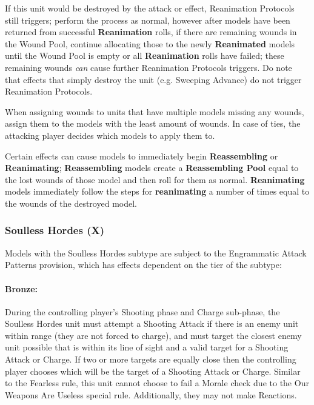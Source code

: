 \begin{multicols}{2}
If this unit would be destroyed by the attack or effect, Reanimation Protocols still triggers; perform the process as normal, however after models have been returned from successful \textbf{Reanimation} rolls, if there are remaining wounds in the Wound Pool, continue allocating those to the newly \textbf{Reanimated} models until the Wound Pool is empty or all \textbf{Reanimation} rolls have failed; these remaining wounds \textit{can} cause further Reanimation Protocols triggers. Do note that effects that simply destroy the unit (e.g. Sweeping Advance) do not trigger Reanimation Protocols.

When assigning wounds to units that have multiple models missing any wounds, assign them to the models with the least amount of wounds. In case of ties, the attacking player decides which models to apply them to.

Certain effects can cause models to immediately begin \textbf{Reassembling} or \textbf{Reanimating}; \textbf{Reassembling} models create a \textbf{Reassembling Pool} equal to the lost wounds of those model and then roll for them as normal. \textbf{Reanimating} models immediately follow the steps for \textbf{reanimating} a number of times equal to the wounds of the destroyed model.

\subsubsection{Soulless Hordes (X)} \label{Soulless Hordes}

Models with the Soulless Hordes subtype are subject to the Engrammatic Attack Patterns provision, which has effects dependent on the tier of the subtype:

\paragraph{Bronze:} During the controlling player's Shooting phase and Charge sub-phase, the Soulless Hordes unit must attempt a Shooting Attack if there is an enemy unit within range (they are not forced to charge), and must target the closest enemy unit possible that is within its line of sight and a valid target for a Shooting Attack or Charge. If two or more targets are equally close then the controlling player chooses which will be the target of a Shooting Attack or Charge. Similar to the Fearless rule, this unit cannot choose to fail a Morale check due to the Our Weapons Are Useless special rule. Additionally, they may not make Reactions.


\end{multicols}
